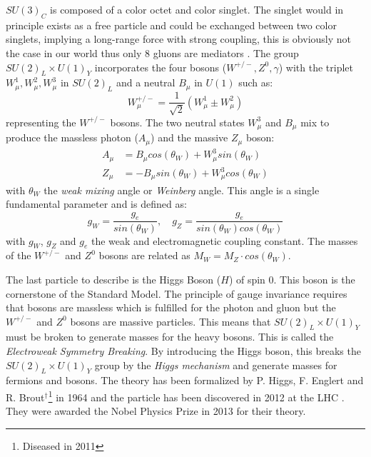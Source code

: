 $SU(3)_{C}$ is composed of a color octet and color singlet. The singlet would in principle exists as a free particle and could be exchanged between two color singlets, implying a long-range force with strong coupling, this is obviously not the case in our world thus only 8 gluons are mediators \cite{Griffiths:343277}. The group $SU(2)_{L} \times U(1)_{Y}$ incorporates the four bosons ($W^{+/-}, Z^0, \gamma$) with the triplet $W_{\mu}^1, W_{\mu}^2, W_{\mu}^3$ in $SU(2)_{L}$ and a neutral $B_{\mu}$ in $U(1)$ such as:
\begin{equation}
  W_{\mu}^{+/-} = \frac{1}{\sqrt{2}}(W_{\mu}^1 \pm W_{\mu}^2)
\end{equation}
representing the $W^{+/-}$ bosons. The two neutral states $W_{\mu}^3$ and $B_{\mu}$ mix to produce the massless photon ($A_{\mu}$) and the massive $Z_{\mu}$ boson:
\begin{equation}
  \begin{aligned}
    A_{\mu} &= B_{\mu} cos(\theta_W) + W_{\mu}^3 sin(\theta_W)\\
    Z_{\mu} &= - B_{\mu} sin(\theta_W) + W_{\mu}^3 cos(\theta_W)
  \end{aligned}
\end{equation}
with $\theta_W$ the \textit{weak mixing} angle or \textit{Weinberg} angle. This angle is a single fundamental parameter and is defined as:
\begin{equation}
  g_W = \frac{g_e}{sin(\theta_W)}, \quad g_Z = \frac{g_e}{sin(\theta_W) cos(\theta_W)}
\end{equation}
with $g_W$, $g_Z$ and $g_e$ the weak and electromagnetic coupling constant. The masses of the $W^{+/-}$ and $Z^0$ bosons are related as $M_W = M_Z \cdot cos(\theta_W)$.

The last particle to describe is the Higgs Boson ($H$) of spin 0. This boson is the cornerstone of the Standard Model. The principle of gauge invariance requires that bosons are massless which is fulfilled for the photon and gluon but the $W^{+/-}$ and $Z^0$ bosons are massive particles. This means that $SU(2)_{L} \times U(1)_{Y}$ must be broken to generate masses for the heavy bosons. This is called the \textit{Electroweak Symmetry Breaking}. By introducing the Higgs boson, this breaks the $SU(2)_{L} \times U(1)_{Y}$ group by the \textit{Higgs mechanism} and generate masses for fermions and bosons. The theory \cite{Higgs:1964pj, Englert:1964et} has been formalized by P. Higgs, F. Englert and R. Brout$^\dagger$\footnote{Diseased in 2011} in 1964 and the particle has been discovered in 2012 at the LHC \cite{Aad:2012tfa, Chatrchyan:2012xdj}. They were awarded the Nobel Physics Prize in 2013 for their theory.

